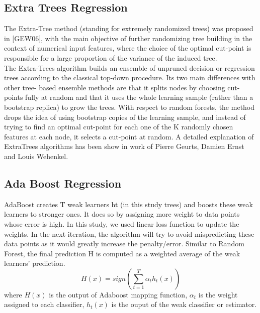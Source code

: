 \documentclass[12pt,a4paper]{report}
\begin{document}
\subsection{Extra Trees Regression}
The Extra-Tree method (standing for extremely randomized trees) was proposed in [GEW06], with the main objective of further randomizing tree building in the context of numerical input features, where the choice of the optimal cut-point is responsible for a large proportion of the variance of the induced tree.\\
The Extra-Trees algorithm builds an ensemble of unpruned decision or regression trees according to the classical top-down procedure. Its two main differences with other tree- based ensemble methods are that it splits nodes by choosing cut-points fully at random and that it uses the whole learning sample (rather than a bootstrap replica) to grow the trees. With respect to random forests, the method drops the idea of using bootstrap copies of the learning sample, and instead of trying to find an optimal cut-point for each one of the K randomly chosen features at each node, it selects a cut-point at random. A detailed explanation of ExtraTrees algorithms has been show in work of Pierre Geurts, Damien Ernst and Louis Wehenkel\cite{Extre}.
\subsection{Ada Boost Regression}
AdaBoost creates T weak learners ht (in this study trees) and boosts these weak learners to stronger ones. It does so by assigning more weight to data points whose error is high. In this study, we used linear loss function to update the weights. In the next iteration, the algorithm will try to avoid mispredicting these data points as it would greatly increase the penalty/error. Similar to Random Forest, the final prediction H is computed as a weighted average of the weak learners’ prediction.\cite{Ristanto}
\begin{equation}
H(x) = sign(\sum_{t=1}^{T}\alpha_{t}h_{t}(x))
\end{equation}
where $H(x)$ is the output of Adaboost mapping function, $\alpha_{t}$ is the weight assigned to each classifier, $h_{t}(x)$ is the ouput of the weak classifier or estimator.\cite{Hastie}
\end{document}
